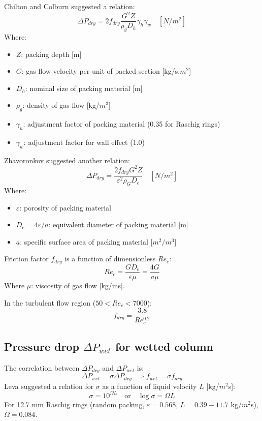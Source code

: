 Chilton and Colburn suggested a relation:
\begin{equation}
    \Delta P_{dry} = 2f_{dry} \frac{G^2 Z}{\rho_g D_h} \gamma_h \gamma_w \quad [N/m^2]
\end{equation}
Where:
\begin{itemize}
    \item $Z$: packing depth [m]
    \item $G$: gas flow velocity per unit of packed section [kg/s.$m^2$]
    \item $D_h$: nominal size of packing material [m]
    \item $\rho_g$: density of gas flow [kg/$m^3$]
    \item $\gamma_h$: adjustment factor of packing material (0.35 for Raschig rings)
    \item $\gamma_w$: adjustment factor for wall effect (1.0)
\end{itemize}

Zhavoronkov suggested another relation:
\begin{equation}
    \Delta P_{dry} = \frac{2f_{dry} G^2 Z}{\varepsilon^2 \rho_G D_e} \quad [N/m^2]
\end{equation}
Where:
\begin{itemize}
    \item $\varepsilon$: porosity of packing material
    \item $D_e = 4\varepsilon / a$: equivalent diameter of packing material [m]
    \item $a$: specific surface area of packing material [$m^2/m^3$]
\end{itemize}

Friction factor $f_{dry}$ is a function of dimensionless $Re_c$:
\begin{equation}
    Re_c = \frac{G D_e}{\varepsilon \mu} = \frac{4G}{a \mu}
\end{equation}
Where $\mu$: viscosity of gas flow [kg/ms].

In the turbulent flow region ($50 < Re_c < 7000$):
\begin{equation}
    f_{dry} = \frac{3.8}{Re_c^{0.2}}
\end{equation}

\subsection{Pressure drop \texorpdfstring{$\Delta P_{wet}$}{Delta P\_wet} for wetted column}
The correlation between $\Delta P_{dry}$ and $\Delta P_{wet}$ is:
\begin{equation}
    \Delta P_{wet} = \sigma \Delta P_{dry} \implies f_{wet} = \sigma f_{dry}
\end{equation}
Leva suggested a relation for $\sigma$ as a function of liquid velocity $L$ [kg/$m^2$s]:
\begin{equation}
    \sigma = 10^{\Omega L} \quad \text{or} \quad \log \sigma = \Omega L
\end{equation}
For 12.7 mm Raschig rings (random packing, $\varepsilon = 0.568$, $L = 0.39 - 11.7$ kg/$m^2$s), $\Omega = 0.084$.

